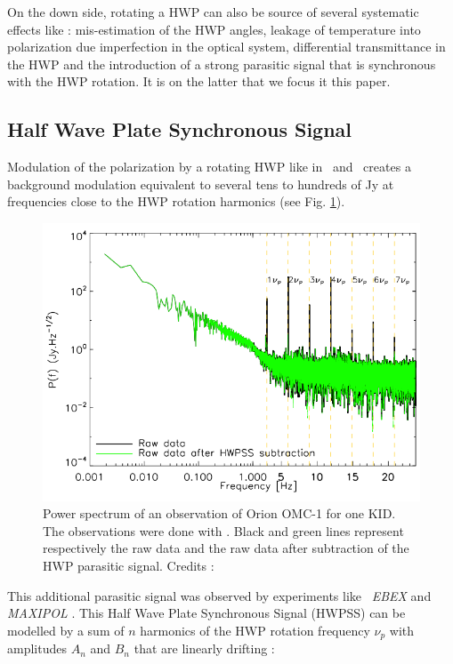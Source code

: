 On the down side, rotating a HWP can also be source of several systematic effects like : mis-estimation of the HWP angles, leakage of temperature into polarization due imperfection in the optical system, differential transmittance in the HWP \citep{2009MNRAS.397..634B,2018SPIE10708E..48S} and the introduction of a strong parasitic signal that is synchronous with the HWP rotation. It is on the latter that we focus it this paper.

\subsection{Half Wave Plate Synchronous Signal}

Modulation of the polarization by a rotating HWP like in \nika\ and \nikad\ creates a background modulation equivalent to several tens to hundreds of Jy at frequencies close to the HWP rotation harmonics \citep{2017A&A...599A..34R} (see Fig. \ref{fig:hwp_power_spectrum}).

\begin{figure}[h]
\center
\includegraphics[clip, angle=0, width=\columnwidth]{Figures/hwp_power_spectrum.png}
\caption{Power spectrum of an observation of Orion OMC-1 for one KID. The observations were done with \nika . Black and green lines represent respectively the raw data and the raw data after subtraction of the HWP parasitic signal. Credits : \citet{2017A&A...599A..34R} }
\label{fig:hwp_power_spectrum}
\end{figure}

This additional parasitic signal was observed by experiments like \, \emph{EBEX} \citep{2010SPIE.7741E..1CR} and \emph{MAXIPOL} \citep{2007ApJ...665...42J}. This Half Wave Plate Synchronous Signal (HWPSS) can be modelled by a sum of $n$ harmonics of the HWP rotation frequency $\nu_{p}$ with amplitudes $A_{n}$ and $B_{n}$ that are linearly drifting :

